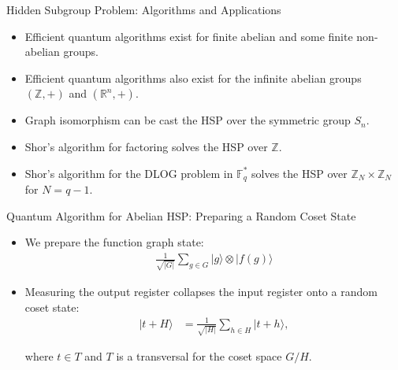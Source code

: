 \documentclass[handout]{beamer} %
\newcommand{\F}{{\mathbb{F}}}
\newcommand{\R}{{\mathbb{R}}}
\newcommand{\Z}{{\mathbb{Z}}}
\renewcommand{\>}{\rangle}
\newcommand{\<}{\langle}
\theoremstyle{definition}
\begin{document}

\begin{frame}{Hidden Subgroup Problem: Algorithms and Applications}
\begin{itemize}
    \item Efficient quantum algorithms exist for finite abelian and some finite non-abelian groups. 

    \bigskip
    \item Efficient quantum algorithms also exist for the infinite abelian groups $(\Z,+)$ and $(\R^n,+)$.

    \bigskip

    \bigskip
    \item Graph isomorphism can be cast the HSP over the symmetric group $S_n$.

    \bigskip
    \item Shor's algorithm for factoring solves the HSP over $\Z$.

    \bigskip
    \item Shor's algorithm for the DLOG problem in $\F_q^*$ solves the HSP over $\Z_N\times\Z_N$ for $N=q-1$.
\end{itemize}
\end{frame}


\begin{frame}{Quantum Algorithm for Abelian HSP: Preparing a Random Coset State}

\begin{itemize}
\item We prepare the function graph state:
\begin{align*}
    \frac{1}{\sqrt{|G|}} \sum_{g \in G} |g\> \otimes |f(g)\> 
\end{align*}

\bigskip
\item Measuring the output register collapses the input register onto a random coset state:
\begin{align*}
|t + H\> 
&= 
\frac{1}{\sqrt{|H|}} \sum_{h \in H} |t + h\>,
\end{align*}

where $ t \in T $ and $ T $ is a transversal for the coset space $ G/H $.
\end{itemize}
\end{frame}

\end{document}
